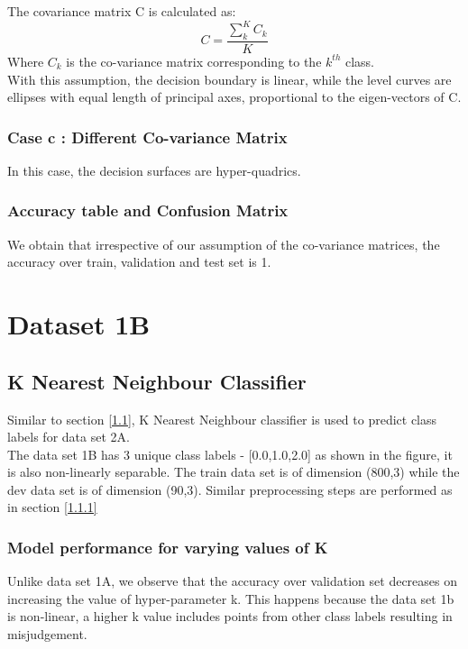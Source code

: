 \documentclass[11pt,a4paper]{article}
\newcommand{\noi}{\noindent}
\begin{document}
The covariance matrix C is calculated as: 
\begin{equation}
    C=\frac{\sum_{k}^{K}C_{k}}{K}
\end{equation}
Where $C_{k}$ is the co-variance matrix corresponding to the $k^{th}$ class.\\
\noi
With this assumption, the decision boundary is linear, while the level curves are ellipses with equal length of principal axes, proportional to the eigen-vectors of C.

\subsubsection{Case c : Different Co-variance Matrix}

In this case, the decision surfaces are hyper-quadrics.


\subsubsection{Accuracy table and Confusion Matrix}

We obtain that irrespective of our assumption of the co-variance matrices, the accuracy over train, validation and test set is 1. 


\break
\section{Dataset 1B}
\subsection{K Nearest Neighbour Classifier} 

Similar to section \ref{1.1}, K Nearest Neighbour classifier is used to predict class labels for data set 2A. \\The data set 1B has 3 unique class labels - [0.0,1.0,2.0] as shown in the figure, it is also non-linearly separable. The train data set is of dimension (800,3) while the dev data set is of dimension (90,3). Similar preprocessing steps are performed as in section \ref{1.1.1}

\subsubsection{Model performance for varying values of K}

Unlike data set 1A, we observe that the accuracy over validation set decreases on increasing the value of hyper-parameter k. This happens because the data set 1b is non-linear, a higher k value includes points from other class labels resulting in misjudgement.
\\
\end{document}
